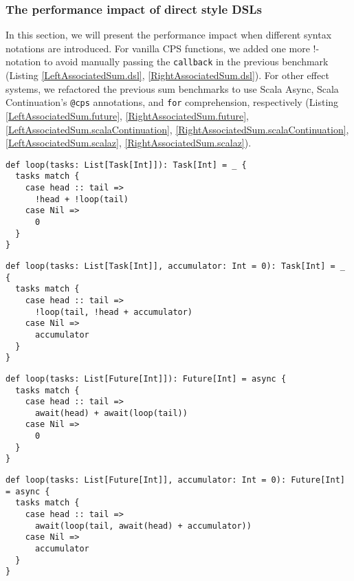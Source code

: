 \subsubsection{The performance impact of direct style DSLs}

In this section, we will present the performance impact when different syntax notations are introduced. For vanilla CPS functions, we added one more !-notation to avoid manually passing the \lstinline{callback} in the previous benchmark (Listing \ref{LeftAssociatedSum.dsl}, \ref{RightAssociatedSum.dsl}). For other effect systems, we refactored the previous sum benchmarks to use Scala Async, Scala Continuation's \lstinline{@cps} annotations, and \lstinline{for} comprehension, respectively (Listing \ref{LeftAssociatedSum.future}, \ref{RightAssociatedSum.future}, \ref{LeftAssociatedSum.scalaContinuation}, \ref{RightAssociatedSum.scalaContinuation}, \ref{LeftAssociatedSum.scalaz}, \ref{RightAssociatedSum.scalaz}).

\begin{lstlisting}[float=htbp,caption={Left-associated sum based on LDKs of \textit{Dsl.scala}},label={LeftAssociatedSum.dsl}]
def loop(tasks: List[Task[Int]]): Task[Int] = _ {
  tasks match {
    case head :: tail =>
      !head + !loop(tail)
    case Nil =>
      0
  }
}
\end{lstlisting}

\begin{lstlisting}[float=htbp,caption={Right-associated sum based on LDKs of \textit{Dsl.scala}},label={RightAssociatedSum.dsl}]
def loop(tasks: List[Task[Int]], accumulator: Int = 0): Task[Int] = _ {
  tasks match {
    case head :: tail =>
      !loop(tail, !head + accumulator)
    case Nil =>
      accumulator
  }
}
\end{lstlisting}

\begin{lstlisting}[float=htbp,caption={Left-associated sum based on Scala Async},label={LeftAssociatedSum.future}]
def loop(tasks: List[Future[Int]]): Future[Int] = async {
  tasks match {
    case head :: tail =>
      await(head) + await(loop(tail))
    case Nil =>
      0
  }
}
\end{lstlisting}

\begin{lstlisting}[float=htbp,caption={Right-associated sum based on Scala Async},label={RightAssociatedSum.future}]
def loop(tasks: List[Future[Int]], accumulator: Int = 0): Future[Int] = async {
  tasks match {
    case head :: tail =>
      await(loop(tail, await(head) + accumulator))
    case Nil =>
      accumulator
  }
}
\end{lstlisting}

